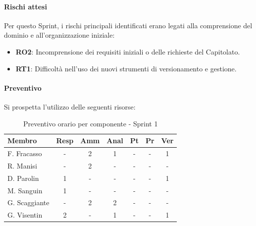 \documentclass[a4paper,12pt]{article}
\begin{document}
\paragraph{Rischi attesi}
Per questo Sprint, i rischi principali identificati erano legati alla comprensione del dominio e all'organizzazione iniziale:
\begin{itemize}
    \item \textbf{RO2}: Incomprensione dei requisiti iniziali o delle richieste del Capitolato.
    \item \textbf{RT1}: Difficoltà nell'uso dei nuovi strumenti di versionamento e gestione.
\end{itemize}

\paragraph{Preventivo}
Si prospetta l'utilizzo delle seguenti risorse:

\begin{table}[H]
    \centering
    \renewcommand{\arraystretch}{1.3}
    \small 
    \begin{tabularx}{\textwidth}{|l|C|C|C|C|C|C|}
        \hline
        \textbf{Membro} & \textbf{Resp} & \textbf{Amm} & \textbf{Anal} & \textbf{Pt} & \textbf{Pr} & \textbf{Ver} \\
        \hline
        F. Fracasso & - & 2 & 1 & - & - & 1 \\
        \hline
        R. Manisi & - & 2 & - & - & - & - \\
        \hline
        D. Parolin & 1 & - & - & - & - & 1 \\
        \hline
        M. Sanguin & 1 & - & - & - & - & - \\
        \hline
        G. Scaggiante & - & 2 & 2 & - & - & - \\
        \hline
        G. Visentin & 2 & - & 1 & - & - & 1 \\
        \hline
    \end{tabularx}
    \caption{Preventivo orario per componente - Sprint 1}
    \label{tab:preventivo_sprint1}
\end{table}
\end{document}
